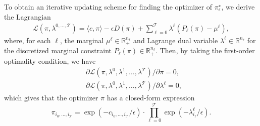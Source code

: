 \documentclass[11pt]{article}
\newcommand{\calL}{{\mathcal L}}
\newcommand{\calT}{{\mathcal T}}
\begin{document}
To obtain an iterative updating scheme for finding the optimizer of $\pi^\star_\epsilon$, we derive the Lagrangian 
\begin{align*}
\calL(\pi,\lambda^{0,\dots,\calT}) =
\langle c,\pi \rangle - \epsilon D(\pi)
+\sum_{\ell=0}^{\calT} \lambda^{\ell} \left(P_\ell(\pi) -\mu^\ell\right),
\end{align*}
where, for each $\ell$, the marginal $\mu^\ell \in \mathbb{R}_+^{n_\ell}$ and Lagrange dual variable $\lambda^\ell \in \mathbb{R}^{n_\ell}$ for the discretized marginal constraint $P_\ell(\pi)\in\mathbb{R}_+^{n_\ell}$. Then, by taking the first-order optimality condition, we have 
\begin{align*}
&\partial\calL(\pi,\lambda^0,\lambda^1,\dots,\lambda^\calT)/\partial \pi = 0,\\
&\partial\calL(\pi,\lambda^0,\lambda^1,\dots,\lambda^\calT)/\partial \lambda^\ell = 0,
\end{align*}
which gives that the optimizer $\pi$ has a closed-form expression 
$$\pi_{i_0,\dots,i_\calT} = \exp(-c_{i_0,\dots,i_\calT}/\epsilon)\cdot \prod_{\ell=0}^{\calT}\exp(-\lambda_{i_\ell}^{\ell}/\epsilon).$$
\end{document}
